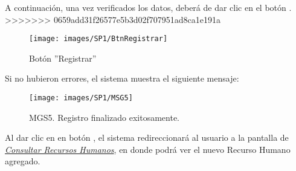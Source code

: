         A continuación, una vez verificados los datos, deberá de dar clic en el botón .
>>>>>>> 0659add31f26577e5b3d02f707951ad8ca1e191a
        \begin{figure}[!hbtp]
            \centering
            \hypertarget{btnreg}{\texttt{[image: images/SP1/BtnRegistrar]}}
            \caption{Botón ''Registrar''}
            \label{btnreg}
        \end{figure}

        Si no hubieron errores, el sistema muestra el siguiente mensaje:
        \newpage
        \begin{figure}[!hbtp]
                \centering
                \hypertarget{buscar}{\texttt{[image: images/SP1/MSG5]}}
                \caption{MGS5. Registro finalizado exitosamente.}
                \label{buscar}
        \end{figure}

        Al dar clic en en botón , el sistema redireccionará al usuario a la pantalla de \hyperlink{consultarrh}{\textit{Consultar Recursos Humanos}}, en donde podrá ver el nuevo Recurso Humano agregado.\\

